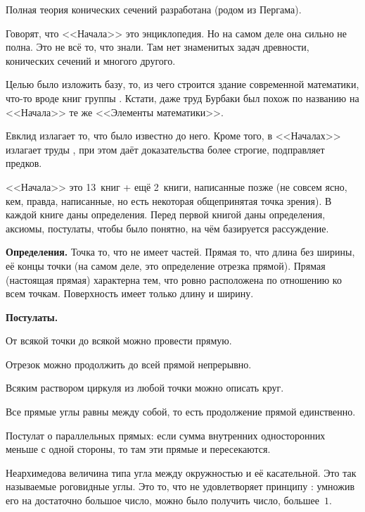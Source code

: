 \documentclass[a4paper,oneside,fleqn,10pt]{article}
\begin{document}
Полная теория конических сечений разработана  (родом из Пергама).

Говорят, что <<Начала>> это энциклопедия. Но на самом деле
она сильно не полна. Это не всё то, что знали. Там нет
знаменитых задач древности, конических сечений и многого другого.

Целью  было изложить базу, то, из чего строится здание
современной математики, что-то вроде книг группы .
Кстати, даже труд Бурбаки был похож по названию
на <<Начала>> те же <<Элементы математики>>.

Евклид излагает то, что было известно до него. Кроме того, в <<Началах>>
 излагает труды , при этом даёт доказательства более строгие, подправляет
предков.

<<Начала>> это 13~книг + ещё 2~книги, написанные позже (не совсем ясно, кем, правда, написанные,
но есть некоторая общепринятая точка зрения). В каждой книге даны определения.
Перед первой книгой даны определения, аксиомы, постулаты, чтобы было понятно,
на чём базируется рассуждение.

\textbf{Определения.}
Точка то, что не имеет частей.
Прямая то, что длина без ширины, её концы точки
(на самом деле, это определение отрезка прямой).
Прямая (настоящая прямая) характерна тем, что
ровно расположена по отношению ко всем точкам.
Поверхность имеет только длину и ширину.

\textbf{Постулаты.}

\begin{nums}{-2}
\item От всякой точки до всякой можно провести прямую.
\item Отрезок можно продолжить до всей прямой непрерывно.
\item Всяким раствором циркуля из любой точки можно описать круг.
\item Все прямые углы равны между собой, то есть продолжение прямой единственно.
\item Постулат о параллельных прямых: если сумма внутренних односторонних меньше с одной стороны,
то там эти прямые и пересекаются.
\end{nums}

Неархимедова величина типа угла между окружностью и её касательной.
Это так называемые роговидные углы. Это то, что не удовлетворяет принципу :
умножив его на достаточно большое число, можно было получить число, большее~$1$.
\end{document}
